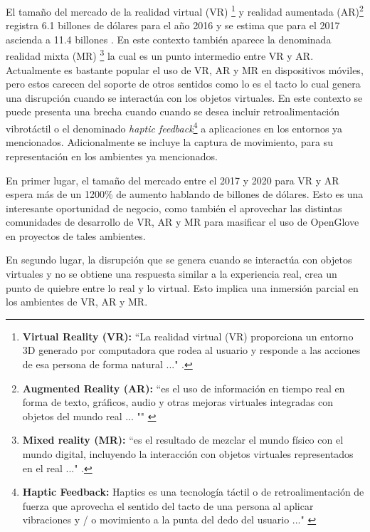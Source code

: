 El tamaño del mercado de la realidad virtual (VR) \footnote{\textbf{Virtual Reality (VR):}  ``La realidad virtual (VR) proporciona un entorno 3D generado por computadora que rodea al usuario y responde a las acciones de esa persona de forma natural ..." \cite{gartner-group-VR}.}  y realidad aumentada (AR)\footnote{\textbf{Augmented Reality (AR):} ``es el uso de información en tiempo real en forma de texto, gráficos, audio y otras mejoras virtuales integradas con objetos del mundo real ... "" \citep{gartner-group-AR}} registra 6.1 billones de dólares para el año 2016 y se estima que para el 2017 ascienda a 11.4 billones \citep{statista-VR-AR}.  En este contexto también aparece la denominada realidad mixta (MR) \footnote{\textbf{Mixed reality (MR):} ``es el resultado de mezclar el mundo físico con el mundo digital,  incluyendo la interacción con objetos virtuales representados en el real ..." \citep{microsoft-MR}.} la cual es un punto intermedio entre VR y AR.  Actualmente es bastante popular el  uso de VR, AR y MR en dispositivos móviles, pero estos carecen del soporte de otros sentidos como lo es el tacto lo cual genera una disrupción cuando se interactúa con los objetos virtuales. En este contexto se puede presenta una brecha cuando cuando se desea incluir retroalimentación vibrotáctil o el denominado \textit{haptic feedback}\footnote{\textbf{Haptic Feedback:} Haptics es una tecnología táctil o de retroalimentación de fuerza que aprovecha el sentido del tacto de una persona al aplicar vibraciones y / o movimiento a la punta del dedo del usuario ..." \citep{gartner-group-haptics}} a aplicaciones en los entornos ya mencionados. Adicionalmente se incluye la captura de movimiento, para su representación en  los ambientes ya mencionados.


En primer lugar, el tamaño del mercado entre el 2017 y 2020 para VR y AR espera más de un 1200\% de aumento hablando de billones de dólares. Esto es una interesante oportunidad de negocio, como también el aprovechar las distintas comunidades de desarrollo de VR, AR y MR para masificar el uso de OpenGlove en proyectos de tales ambientes. 

En segundo lugar, la disrupción que se genera cuando se interactúa con objetos virtuales y no se obtiene una respuesta similar a la experiencia real, crea un punto de quiebre entre lo real y lo virtual. Esto implica una inmersión parcial en los ambientes de VR, AR y MR.

